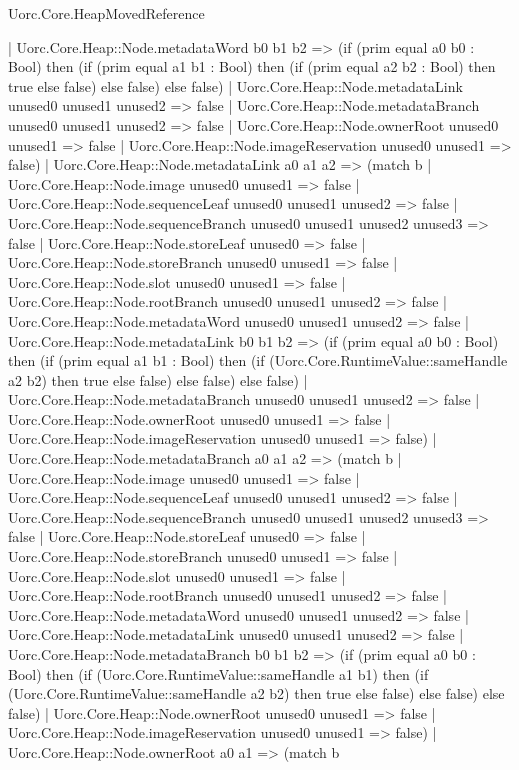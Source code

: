 \begin{lexlean}{Uorc.Core.HeapMovedReference}
\begin{semanticmodule}
{      | Uorc.Core.Heap::Node.metadataWord b0 b1 b2 => (if (prim equal a0 b0 : Bool) then (if (prim equal a1 b1 : Bool) then (if (prim equal a2 b2 : Bool) then true else false) else false) else false)
      | Uorc.Core.Heap::Node.metadataLink unused0 unused1 unused2 => false
      | Uorc.Core.Heap::Node.metadataBranch unused0 unused1 unused2 => false
      | Uorc.Core.Heap::Node.ownerRoot unused0 unused1 => false
      | Uorc.Core.Heap::Node.imageReservation unused0 unused1 => false)
    | Uorc.Core.Heap::Node.metadataLink a0 a1 a2 => (match b
      | Uorc.Core.Heap::Node.image unused0 unused1 => false
      | Uorc.Core.Heap::Node.sequenceLeaf unused0 unused1 unused2 => false
      | Uorc.Core.Heap::Node.sequenceBranch unused0 unused1 unused2 unused3 => false
      | Uorc.Core.Heap::Node.storeLeaf unused0 => false
      | Uorc.Core.Heap::Node.storeBranch unused0 unused1 => false
      | Uorc.Core.Heap::Node.slot unused0 unused1 => false
      | Uorc.Core.Heap::Node.rootBranch unused0 unused1 unused2 => false
      | Uorc.Core.Heap::Node.metadataWord unused0 unused1 unused2 => false
      | Uorc.Core.Heap::Node.metadataLink b0 b1 b2 => (if (prim equal a0 b0 : Bool) then (if (prim equal a1 b1 : Bool) then (if (Uorc.Core.RuntimeValue::sameHandle a2 b2) then true else false) else false) else false)
      | Uorc.Core.Heap::Node.metadataBranch unused0 unused1 unused2 => false
      | Uorc.Core.Heap::Node.ownerRoot unused0 unused1 => false
      | Uorc.Core.Heap::Node.imageReservation unused0 unused1 => false)
    | Uorc.Core.Heap::Node.metadataBranch a0 a1 a2 => (match b
      | Uorc.Core.Heap::Node.image unused0 unused1 => false
      | Uorc.Core.Heap::Node.sequenceLeaf unused0 unused1 unused2 => false
      | Uorc.Core.Heap::Node.sequenceBranch unused0 unused1 unused2 unused3 => false
      | Uorc.Core.Heap::Node.storeLeaf unused0 => false
      | Uorc.Core.Heap::Node.storeBranch unused0 unused1 => false
      | Uorc.Core.Heap::Node.slot unused0 unused1 => false
      | Uorc.Core.Heap::Node.rootBranch unused0 unused1 unused2 => false
      | Uorc.Core.Heap::Node.metadataWord unused0 unused1 unused2 => false
      | Uorc.Core.Heap::Node.metadataLink unused0 unused1 unused2 => false
      | Uorc.Core.Heap::Node.metadataBranch b0 b1 b2 => (if (prim equal a0 b0 : Bool) then (if (Uorc.Core.RuntimeValue::sameHandle a1 b1) then (if (Uorc.Core.RuntimeValue::sameHandle a2 b2) then true else false) else false) else false)
      | Uorc.Core.Heap::Node.ownerRoot unused0 unused1 => false
      | Uorc.Core.Heap::Node.imageReservation unused0 unused1 => false)
    | Uorc.Core.Heap::Node.ownerRoot a0 a1 => (match b
}
\end{semanticmodule}
\end{lexlean}
